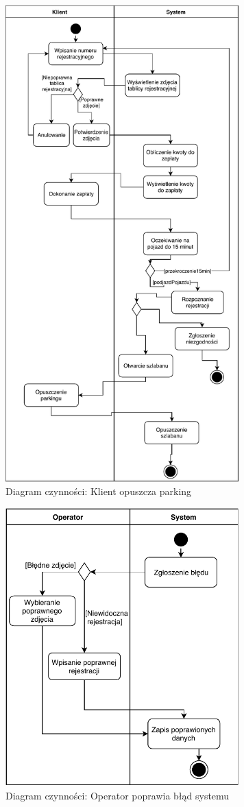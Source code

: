 \begin{figure}[H]
	\centering
	\includegraphics[width=90mm]{diagramy/DiagCzynWyjazd.pdf}
	\caption{Diagram czynności: Klient opuszcza parking}
\end{figure}


\begin{figure}[H]
	\centering
	\includegraphics[width=90mm]{diagramy/DiagCzynWeryfikacja.pdf}
	\caption{Diagram czynności: Operator poprawia błąd systemu}
\end{figure}

